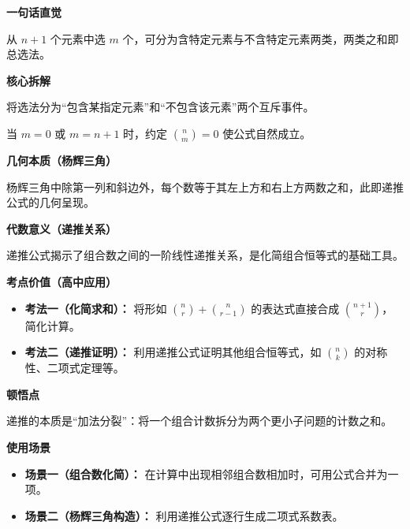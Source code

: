 \begin{explanationbox}
	\textbf{\textcolor{CExplanation}{一句话直觉}}

	从 $n+1$ 个元素中选 $m$ 个，可分为含特定元素与不含特定元素两类，两类之和即总选法。

	\medskip
	\textbf{\textcolor{CExplanation}{核心拆解}}
	\begin{description}[style=nextline, leftmargin=2.8em, labelsep=0.5em, itemsep=0.45em]
		\item[\textbf{要点一（分类思想）：}] 将选法分为“包含某指定元素”和“不包含该元素”两个互斥事件。
		\item[\textbf{要点二（边界约定）：}] 当 $m=0$ 或 $m=n+1$ 时，约定 $\binom{n}{m}=0$ 使公式自然成立。
	\end{description}

	\medskip
	\textbf{\textcolor{CExplanation}{几何本质（杨辉三角）}}

	杨辉三角中除第一列和斜边外，每个数等于其左上方和右上方两数之和，此即递推公式的几何呈现。

	\medskip
	\textbf{\textcolor{CExplanation}{代数意义（递推关系）}}

	递推公式揭示了组合数之间的一阶线性递推关系，是化简组合恒等式的基础工具。

	\medskip
	\textbf{\textcolor{CExplanation}{考点价值（高中应用）}}
	\begin{itemize}[leftmargin=*, itemsep=0.5em, topsep=0.4em]
		\item \textbf{考法一（化简求和）：} 将形如 $\binom{n}{r}+\binom{n}{r-1}$ 的表达式直接合成 $\binom{n+1}{r}$，简化计算。
		\item \textbf{考法二（递推证明）：} 利用递推公式证明其他组合恒等式，如 $\binom{n}{k}$ 的对称性、二项式定理等。
	\end{itemize}

	\medskip
	\textbf{\textcolor{CExplanation}{顿悟点}}

	递推的本质是“加法分裂”：将一个组合计数拆分为两个更小子问题的计数之和。

	\medskip
	\textbf{\textcolor{CExplanation}{使用场景}}
	\begin{itemize}[leftmargin=*, itemsep=0.5em, topsep=0.4em]
		\item \textbf{场景一（组合数化简）：} 在计算中出现相邻组合数相加时，可用公式合并为一项。
		\item \textbf{场景二（杨辉三角构造）：} 利用递推公式逐行生成二项式系数表。
	\end{itemize}
\end{explanationbox}
